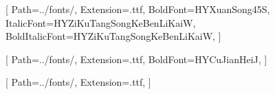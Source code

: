 [%
    Path=../fonts/,
    Extension=.ttf,
    BoldFont=HYXuanSong45S,
    ItalicFont=HYZiKuTangSongKeBenLiKaiW,
    BoldItalicFont=HYZiKuTangSongKeBenLiKaiW,
]

[%
    Path=../fonts/,
    Extension=.ttf,
    BoldFont=HYCuJianHeiJ,
]

[
    Path=../fonts/,
    Extension=.ttf,
]
